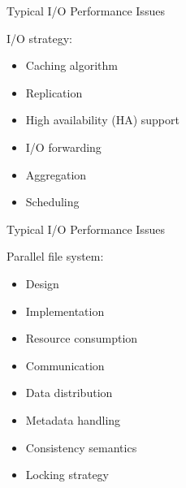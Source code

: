 \documentclass[compress,11pt,xcolor=svgnames,aspectratio=169]{beamer}
\begin{document}
\begin{frame}[t]{Typical I/O Performance Issues}

I/O strategy:

    \begin{itemize}
    \setlength\itemsep{0.3cm}
        \item Caching algorithm
        \item Replication
        \item High availability (HA) support
        \item I/O forwarding
        \item Aggregation
        \item Scheduling
    \end{itemize}

\end{frame}

\begin{frame}[t]{Typical I/O Performance Issues}

Parallel file system:

    \begin{itemize}
    \setlength\itemsep{0.3cm}
        \item Design
        \item Implementation
        \item Resource consumption
        \item Communication
        \item Data distribution
        \item Metadata handling
        \item Consistency semantics
        \item Locking strategy
    \end{itemize}

\end{frame}
\end{document}
